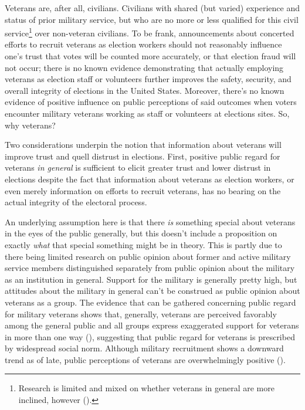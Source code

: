 \documentclass[
  12pt,
  letterpaper,
]{article}
\begin{document}
Veterans are, after all, civilians. Civilians with shared (but varied)
experience and status of prior military service, but who are no more or
less qualified for this civil service\footnote{Research is limited and
  mixed on whether veterans in general are more inclined, however
  ().} over
non-veteran civilians. To be frank, announcements about concerted
efforts to recruit veterans as election workers should not reasonably
influence one's trust that votes will be counted more accurately, or
that election fraud will not occur; there is no known evidence
demonstrating that actually employing veterans as election staff or
volunteers further improves the safety, security, and overall integrity
of elections in the United States. Moreover, there's no known evidence
of positive influence on public perceptions of said outcomes when voters
encounter military veterans working as staff or volunteers at elections
sites. So, why veterans?

Two considerations underpin the notion that information about veterans
will improve trust and quell distrust in elections. First, positive
public regard for veterans \emph{in general} is sufficient to elicit
greater trust and lower distrust in elections despite the fact that
information about veterans as election workers, or even merely
information on efforts to recruit veterans, has no bearing on the actual
integrity of the electoral process.

An underlying assumption here is that there \emph{is} something special
about veterans in the eyes of the public generally, but this doesn't
include a proposition on exactly \emph{what} that special something
might be in theory. This is partly due to there being limited research
on public opinion about former and active military service members
distinguished separately from public opinion about the military as an
institution in general. Support for the military is generally pretty
high, but attitudes about the military in general can't be construed as
public opinion about veterans as a group. The evidence that can be
gathered concerning public regard for military veterans shows that,
generally, veterans are perceived favorably among the general public and
all groups express exaggerated support for veterans in more than one way
(),
suggesting that public regard for veterans is prescribed by widespread
social norm. Although military recruitment shows a downward trend as of
late, public perceptions of veterans are overwhelmingly positive
().
\end{document}
